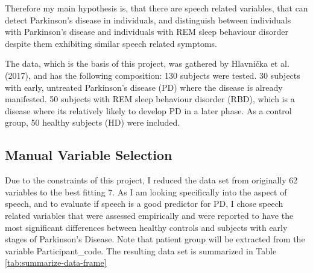 \documentclass[
  english,
  doc,floatsintext]{apa6}
\begin{document}
Therefore my main hypothesis is, that there are speech related variables, that can detect Parkinson's disease
in individuals, and distinguish between individuals with Parkinson's disease and individuals with REM sleep
behaviour disorder despite them exhibiting similar speech related symptoms.

The data, which is the basis of this project, was gathered by Hlavnička et al. (2017), and has the following composition:
130 subjects were tested. 30 subjects with early, untreated Parkinson's disease (PD) where the disease
is already manifested. 50 subjects with REM sleep behaviour disorder (RBD), which is a disease where
its relatively likely to develop PD in a later phase. As a control group, 50 healthy subjects (HD) were included.

\hypertarget{manual-variable-selection}{%
\subsection{Manual Variable Selection}\label{manual-variable-selection}}

Due to the constraints of this project, I reduced the data set from originally 62 variables to the best fitting 7.
As I am looking specifically into the aspect of speech, and to evaluate if speech is a good predictor for PD,
I chose speech related variables that were assessed empirically and were reported to have the most significant differences
between healthy controls and subjects with early stages of Parkinson's Disease.
Note that patient group will be extracted from the variable Participant\_code.
The resulting data set is summarized in Table \ref{tab:summarize-data-frame}
\end{document}
